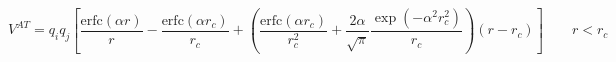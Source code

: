 \documentclass[12pt]{article}
\begin{document}
$$
  V^{AT} = 
  q_iq_j \left[ \frac{\mbox{erfc} (\alpha r)}{r} -  \frac{\mbox{erfc} (\alpha r_c)}{r_c} + 
  \left( \frac{\mbox{erfc} (\alpha r_c)}{r_c^2} +  \frac{2\alpha}{\sqrt{\pi}}\frac{\exp (-\alpha^2    r^2_c)}{r_c} \right)(r-r_c) \right] \qquad r < r_c 
$$
\end{document}
